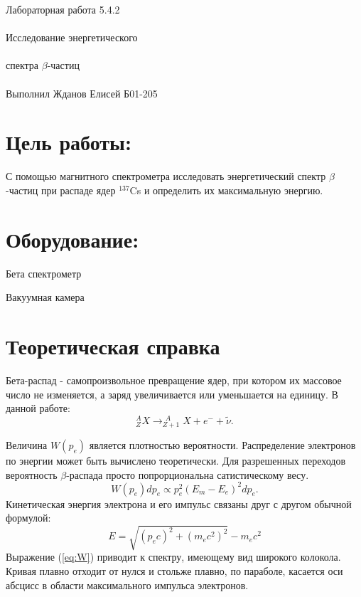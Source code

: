 \documentclass{astroedu-lab}
\begin{document}
\pagestyle{plain}

\begin{problem}{\huge Лабораторная работа 5.4.2\\\\Исследование энергетического\\\\спектра $\beta$-частиц\\\\Выполнил Жданов Елисей Б01-205}

\section{Цель работы:}

С помощью магнитного спектрометра исследовать энергетический спектр $\beta$-частиц при распаде ядер $^{137}$Cs и определить их максимальную энергию.


\section{Оборудование:}

Бета спектрометр

Вакуумная камера

\section{Теоретическая справка}

Бета-распад - самопроизвольное превращение ядер, при котором их массовое число не изменяется, а заряд увеличивается или уменьшается на единицу.
	В данной работе:
	$$^A_Z X \to ^{\ \, A}_{Z+1} X + e^- + \widetilde{\nu} .$$
	
	Величина $W(p_e)$ является плотностью вероятности. Распределение электронов по энергии может быть вычислено теоретически. Для разрешенных переходов вероятность $\beta$-распада просто попрорциональна сатистическому весу.
	\begin{equation*}
		\label{eq:W}
		W(p_e)dp_e \propto p_e^2(E_m-E_e)^2 dp_e.
	\end{equation*}
	Кинетическая энергия электрона и его импульс связаны друг с другом обычной формулой:
	\begin{equation*}
		E = \sqrt{(p_ec)^2+(m_ec^2)^2}-m_ec^2
	\end{equation*}
	Выражение (\ref{eq:W}) приводит к спектру, имеющему вид широкого колокола. Кривая плавно отходит от нулся и стольже плавно, по параболе, касается оси абсцисс в области максимального импульса электронов.
	

\end{problem}
\end{document}
